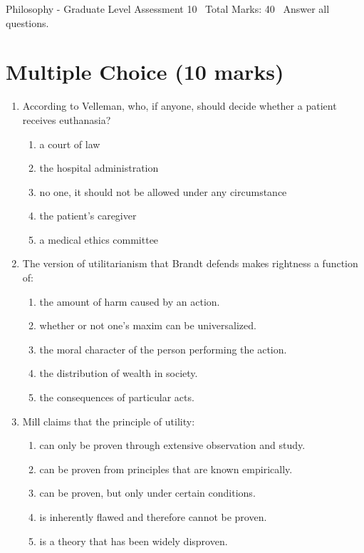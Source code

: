 \documentclass[12pt]{article}
\begin{document}
\begin{center}
Philosophy - Graduate Level Assessment 10 \
Total Marks: 40 \
Answer all questions.
\end{center}

\section*{Multiple Choice (10 marks)}
\begin{enumerate}[label=\arabic*.]
\item According to Velleman, who, if anyone, should decide whether a patient receives euthanasia?
\begin{enumerate}[label=(\alph*)]
    \item a court of law
    \item the hospital administration
    \item no one, it should not be allowed under any circumstance
    \item the patient's caregiver
    \item a medical ethics committee
\end{enumerate}
\item The version of utilitarianism that Brandt defends makes rightness a function of:
\begin{enumerate}[label=(\alph*)]
    \item the amount of harm caused by an action.
    \item whether or not one's maxim can be universalized.
    \item the moral character of the person performing the action.
    \item the distribution of wealth in society.
    \item the consequences of particular acts.
\end{enumerate}
\item Mill claims that the principle of utility:
\begin{enumerate}[label=(\alph*)]
    \item can only be proven through extensive observation and study.
    \item can be proven from principles that are known empirically.
    \item can be proven, but only under certain conditions.
    \item is inherently flawed and therefore cannot be proven.
    \item is a theory that has been widely disproven.
\end{enumerate}

\end{enumerate}
\end{document}
